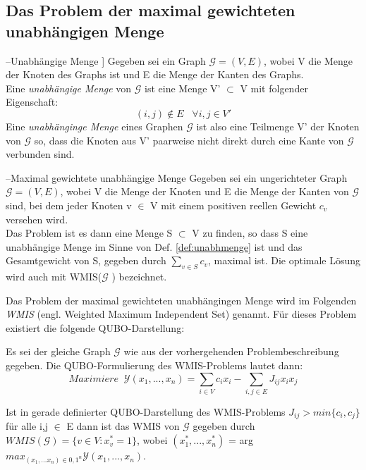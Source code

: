 \documentclass[runningheads]{llncs}
\begin{document}
\subsection{Das Problem der maximal gewichteten unabhängigen Menge}\label{chap:wmis}

--Unabhängige Menge \cite{feo1994greedy}]\label{def:unabhmenge}
Gegeben sei ein Graph $\mathcal{G} = (V,E)$, wobei V die Menge der Knoten des Graphs ist und E die Menge der Kanten des Graphs.\\Eine \emph{unabhängige Menge} von $\mathcal{G}$ ist eine Menge V' $\subset$ V mit folgender Eigenschaft:
\begin{equation}
(i,j) \notin E \;\;\;\forall i,j \in V' 
\end{equation}
Eine \emph{unabhänginge Menge} eines Graphen $\mathcal{G}$ ist also eine Teilmenge V' der Knoten von $\mathcal{G}$ so, dass die Knoten aus V' paarweise nicht direkt durch eine Kante von $\mathcal{G}$  verbunden sind.

--Maximal gewichtete unabhängige Menge \cite{choi2010adiabatic}
Gegeben sei ein ungerichteter Graph $\mathcal{G} = (V, E)$, wobei V die Menge der Knoten und E die Menge der Kanten von $\mathcal{G}$ sind, bei dem jeder Knoten v $\in$ V mit einem positiven reellen Gewicht $c_{v}$ versehen wird.\\
Das Problem ist es dann eine Menge S $\subset$ V zu finden, so dass S eine unabhängige Menge im Sinne von Def. \ref{def:unabhmenge} ist und das Gesamtgewicht von S, gegeben durch $\sum_{v \in S} c_{v}$, maximal ist. Die optimale Lösung wird auch mit WMIS($\mathcal{G}$ ) bezeichnet.

\noindent
Das Problem der maximal gewichteten unabhängingen Menge wird im Folgenden \emph{WMIS} (engl. Weighted Maximum Independent Set) genannt. Für dieses Problem existiert die folgende QUBO-Darstellung:

Es sei der gleiche Graph $\mathcal{G}$ wie aus der vorhergehenden Problembeschreibung gegeben. Die QUBO-Formulierung des WMIS-Problems lautet dann:
\begin{equation}\label{wmis:qubo}
Maximiere \;\;\mathcal{Y}(x_{1},...,x_{n}) = \sum_{i \in V}c_{i}x_{i} - \sum_{i,j \in E}J_{ij}x_{i}x_{j}
\end{equation}


Ist in gerade definierter QUBO-Darstellung des WMIS-Problems $J_{ij} > min \{c_{i},c_{j}\}$ für alle i,j $\in$ E dann ist das WMIS von $\mathcal{G}$ gegeben durch $WMIS(\mathcal{G})=\{v \in V: x^*_{v}=1\}$, wobei $(x^*_{1},...,x^*_{n})$ = arg $max_{(x_{1},...x_{n})\in{0,1}^n} \mathcal{Y}(x_{1},...,x_{n}).$
\end{document}
